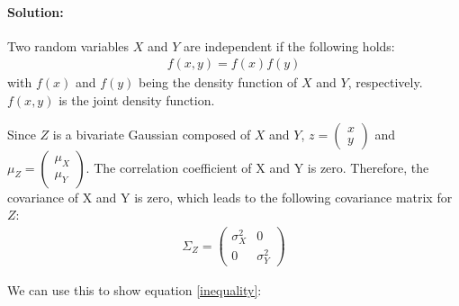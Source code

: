 \documentclass{article}
\begin{document}
\paragraph*{Solution:}
Two random variables $X$ and $Y$ are independent if the following holds:
\begin{eqnarray}
f(x,y) = f(x)f(y)
\label{inequality}
\end{eqnarray}
with $f(x)$ and $f(y)$ being the density function of $X$ and $Y$, respectively. $f(x,y)$ is the joint density function.

Since $Z$ is a bivariate Gaussian composed of $X$ and $Y$, $z = \left( \begin{array}{c} x\\y\end{array} \right)$ and $\mu_Z = \left(\begin{array}{c}\mu_X\\\mu_Y\end{array}\right)$. The correlation coefficient of X and Y is zero. Therefore, the covariance of X and Y is zero, which leads to the following covariance matrix for $Z$:
\begin{eqnarray}
\Sigma_Z = \left( \begin{array}{cc}
\sigma_X^2 & 0\\
0 & \sigma_Y^2
\end{array} \right)
\end{eqnarray}

We can use this to show equation \ref{inequality}:
\end{document}
